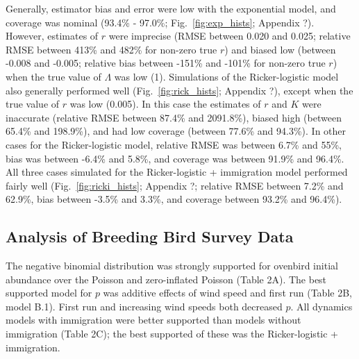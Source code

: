 \documentclass[12pt]{article}
\begin{document}
Generally, estimator bias and error were low with the exponential model, and 
coverage was nominal (93.4\% - 97.0\%; Fig.~\ref{fig:exp_hists}; Appendix ?). 
However, estimates of $r$ were 
imprecise (RMSE between 0.020 and 0.025; relative RMSE between 413\% and 
482\% for non-zero true $r$) and biased low (between -0.008 and -0.005; relative bias between
-151\% and -101\% for non-zero true $r$) when the true value of $\Lambda$ was low (1). 
Simulations of the Ricker-logistic model also generally performed well (Fig.~\ref{fig:rick_hists}; 
Appendix ?), except when the true value of $r$ was low (0.005). In this case the 
estimates of $r$ and $K$ were inaccurate (relative RMSE between 87.4\% and 2091.8\%),
biased high (between 65.4\% and 198.9\%), and had low coverage (between 77.6\% and 94.3\%).
In other cases for the Ricker-logistic model, relative RMSE was between 6.7\%
and 55\%, bias was between -6.4\% and 5.8\%, and coverage was between
91.9\% and 96.4\%.  All three cases simulated for the Ricker-logistic + immigration model 
performed fairly well (Fig.~\ref{fig:ricki_hists}; Appendix ?; relative RMSE between 7.2\% 
and 62.9\%, bias between -3.5\% and 3.3\%, and coverage between
93.2\% and 96.4\%).
  
\subsection{Analysis of Breeding Bird Survey Data}


The negative binomial distribution was strongly supported for ovenbird
initial abundance over the Poisson and zero-inflated Poisson
(Table 2A). %
The best supported model for $p$ was additive effects of wind speed
and first run (Table 2B, model B.1). First run and increasing wind
speeds both decreased $p$. All dynamics models with immigration were
better supported than models without immigration (Table 2C); 
the best supported of these was the Ricker-logistic + immigration.
\end{document}
